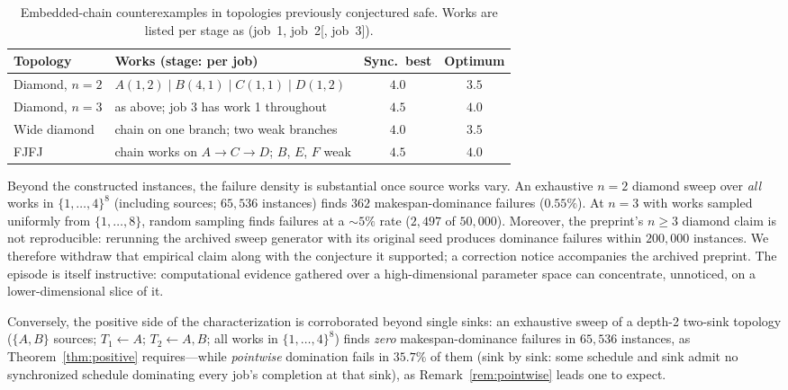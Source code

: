 \documentclass[sn-mathphys,NameDate]{sn-jnl}
\theoremstyle{thmstyleone}
\theoremstyle{thmstylethree}
\theoremstyle{thmstyletwo}
\begin{document}
\begin{table}[h]
\centering
\caption{Embedded-chain counterexamples in topologies
previously conjectured safe. Works are listed per stage as
(job~1, job~2[, job~3]).}
\label{tab:falsification}
\begin{tabular}{llcc}
\toprule
\textbf{Topology} & \textbf{Works (stage: per job)} &
\textbf{Sync.\ best} & \textbf{Optimum} \\
\midrule
Diamond, $n{=}2$ & $A(1,2) \mid B(4,1) \mid C(1,1) \mid D(1,2)$
  & $4.0$ & $3.5$ \\
Diamond, $n{=}3$ & as above; job 3 has work 1 throughout
  & $4.5$ & $4.0$ \\
Wide diamond & chain on one branch; two weak branches
  & $4.0$ & $3.5$ \\
FJFJ & chain works on $A \to C \to D$; $B$, $E$, $F$ weak
  & $4.5$ & $4.0$ \\
\bottomrule
\end{tabular}
\end{table}

Beyond the constructed instances, the failure density is
substantial once source works vary. An exhaustive $n = 2$
diamond sweep over \emph{all} works in $\{1, \ldots, 4\}^8$
(including sources; $65{,}536$ instances) finds $362$
makespan-dominance failures ($0.55\%$). At $n = 3$ with works
sampled uniformly from $\{1, \ldots, 8\}$, random sampling
finds failures at a ${\sim}5\%$ rate ($2{,}497$ of
$50{,}000$). Moreover, the preprint's $n \geq 3$ diamond claim
is not reproducible: rerunning the archived sweep generator
with its original seed produces dominance failures within
$200{,}000$ instances. We therefore withdraw that empirical
claim along with the conjecture it supported; a correction
notice accompanies the archived preprint. The episode is
itself instructive: computational evidence gathered over a
high-dimensional parameter space can concentrate, unnoticed,
on a lower-dimensional slice of it.

Conversely, the positive side of the characterization is
corroborated beyond single sinks: an exhaustive sweep of a
depth-2 two-sink topology ($\{A, B\}$ sources;
$T_1 \leftarrow A$; $T_2 \leftarrow A, B$; all works in
$\{1, \ldots, 4\}^8$) finds \emph{zero} makespan-dominance
failures in $65{,}536$ instances, as
Theorem~\ref{thm:positive} requires---while \emph{pointwise}
domination fails in $35.7\%$ of them (sink by sink: some
schedule and sink admit no synchronized schedule dominating
every job's completion at that sink), as
Remark~\ref{rem:pointwise} leads one to expect.
\end{document}
